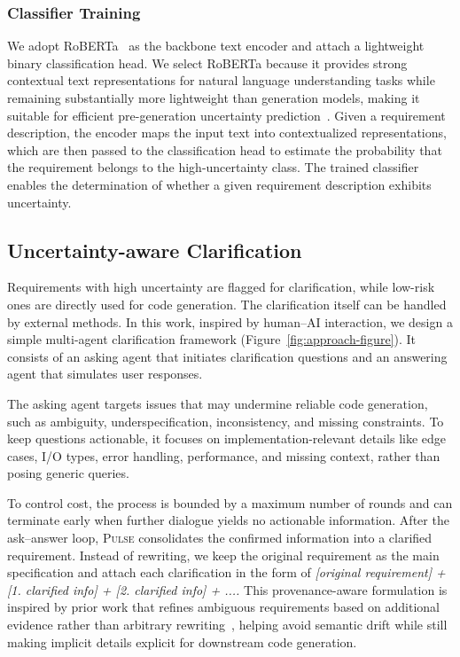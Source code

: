 \subsubsection{Classifier Training}
We adopt RoBERTa~\cite{liu2019roberta} as the backbone text encoder and attach a lightweight binary classification head. 
We select RoBERTa because it provides strong contextual text representations for natural language understanding tasks while remaining substantially more lightweight than generation models, making it suitable for efficient pre-generation uncertainty prediction~\cite{liu2019roberta,devlin2019bert}. 
Given a requirement description, the encoder maps the input text into contextualized representations, which are then passed to the classification head to estimate the probability that the requirement belongs to the high-uncertainty class.
The trained classifier enables the determination of whether a given requirement description exhibits uncertainty.


\subsection{Uncertainty-aware Clarification}
Requirements with high uncertainty are flagged for clarification, while low-risk ones are directly used for code generation. The clarification itself can be handled by external methods. In this work, inspired by human–AI interaction, we design a simple multi-agent clarification framework (Figure~\ref{fig:approach-figure}). It consists of an asking agent that initiates clarification questions and an answering agent that simulates user responses.

The asking agent targets issues that may undermine reliable code generation, such as ambiguity, underspecification, inconsistency, and missing constraints. To keep questions actionable, it focuses on implementation-relevant details like edge cases, I/O types, error handling, performance, and missing context, rather than posing generic queries.

To control cost, the process is bounded by a maximum number of rounds and can terminate early when further dialogue yields no actionable information. After the ask–answer loop, \textsc{Pulse} consolidates the confirmed information into a clarified requirement. Instead of rewriting, we keep the original requirement as the main specification and attach each clarification in the form of \emph{[original requirement] + [1. clarified info] + [2. clarified info] + ....} This provenance-aware formulation is inspired by prior work that refines ambiguous requirements based on additional evidence rather than arbitrary rewriting~\cite{mu2024clarifygpt,jia2025specfix}, helping avoid semantic drift while still making implicit details explicit for downstream code generation.
